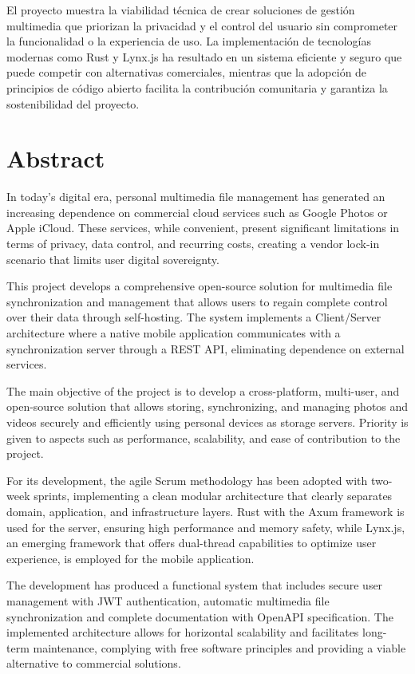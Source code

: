 El proyecto muestra la viabilidad técnica de crear soluciones de gestión multimedia que priorizan la privacidad y el control del usuario sin comprometer la funcionalidad o la experiencia de uso. La implementación de tecnologías modernas como Rust y Lynx.js ha resultado en un sistema eficiente y seguro que puede competir con alternativas comerciales, mientras que la adopción de principios de código abierto facilita la contribución comunitaria y garantiza la sostenibilidad del proyecto.

\newpage
\section*{Abstract}

In today's digital era, personal multimedia file management has generated an increasing dependence on commercial cloud services such as Google Photos or Apple iCloud. These services, while convenient, present significant limitations in terms of privacy, data control, and recurring costs, creating a vendor lock-in scenario that limits user digital sovereignty.

This project develops a comprehensive open-source solution for multimedia file synchronization and management that allows users to regain complete control over their data through self-hosting. The system implements a Client/Server architecture where a native mobile application communicates with a synchronization server through a REST API, eliminating dependence on external services.

The main objective of the project is to develop a cross-platform, multi-user, and open-source solution that allows storing, synchronizing, and managing photos and videos securely and efficiently using personal devices as storage servers. Priority is given to aspects such as performance, scalability, and ease of contribution to the project.

For its development, the agile Scrum methodology has been adopted with two-week sprints, implementing a clean modular architecture that clearly separates domain, application, and infrastructure layers. Rust with the Axum framework is used for the server, ensuring high performance and memory safety, while Lynx.js, an emerging framework that offers dual-thread capabilities to optimize user experience, is employed for the mobile application.

The development has produced a functional system that includes secure user management with JWT authentication, automatic multimedia file synchronization and complete documentation with OpenAPI specification. The implemented architecture allows for horizontal scalability and facilitates long-term maintenance, complying with free software principles and providing a viable alternative to commercial solutions.

